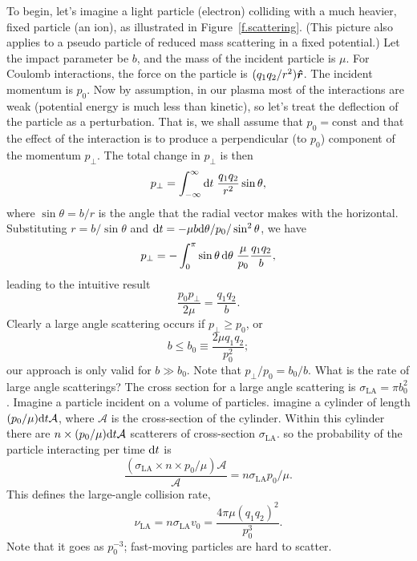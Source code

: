 To begin, let's imagine a light particle (electron) colliding with a much heavier, fixed particle (an ion), as illustrated in Figure~\ref{f.scattering}.  (This picture also applies to a pseudo particle of reduced mass scattering in a fixed potential.)  Let the impact parameter be $b$, and the mass of the incident particle is $\mu$.  For Coulomb interactions, the force on the particle is $(q_{1}q_{2}/r^{2})\boldsymbol{\hat{r}}$. The incident momentum is $p_{0}$. Now by assumption, in our plasma most of the interactions are weak (potential energy is much less than kinetic), so let's treat the deflection of the particle as a perturbation.  That is, we shall assume that $p_{0} = \textrm{const}$ and that the effect of the interaction is to produce a perpendicular (to $p_{0}$) component of the momentum $p_{\bot}$.  The total change in $p_{\bot}$ is then
\[ p_{\bot} = \int_{-\infty}^{\infty}\mathrm{d} t\; \frac{q_{1}q_{2}}{r^{2}}\sin\theta, \]
where $\sin\theta = b/r$ is the angle that the radial vector makes with the horizontal.  Substituting $r = b/\sin\theta$ and $\mathrm{d} t = -\mu b \mathrm{d} \theta/p_{0}/\sin^{2}\theta$, we have
\[ p_{\bot} = -\int_{0}^{\pi} \sin\theta\,\mathrm{d}\theta\; \frac{\mu}{p_{0}}\frac{q_{1}q_{2}}{b}, \]
leading to the intuitive result
\begin{equation}\label{e.pperp}
\frac{p_{0}p_{\bot}}{2\mu} = \frac{q_{1}q_{2}}{b}.
\end{equation}
Clearly a large angle scattering occurs if $p_{\bot}\ge p_{0}$, or
\begin{equation}\label{e.b0}
b \le b_{0} \equiv \frac{2\mu q_{1}q_{2}}{p_{0}^{2}};
\end{equation}
our approach is only valid for $b \gg b_{0}$.  Note that $p_{\bot}/p_{0} = b_{0}/b$. What is the rate of large angle  scatterings? The cross section for a large angle scattering is
$ \sigma_{\mathrm{LA}} = \pi b_{0}^{2}$.  Imagine a particle incident on a volume of particles.  imagine a cylinder of length $(p_{0}/\mu)\mathrm{d} t \mathcal{A}$, where $\mathcal{A}$ is the cross-section of the cylinder.  Within this cylinder there are $n\times (p_{0}/\mu)\mathrm{d} t \mathcal{A}$ scatterers of cross-section $\sigma_{\mathrm{LA}}$. so the probability of the particle interacting per time $\mathrm{d} t$ is
\[ \frac{(\sigma_{\mathrm{LA}}\times n\times p_{0}/\mu) \mathcal{A}}{\mathcal{A}}  = n\sigma_{\mathrm{LA}} p_{0}/\mu. \]
This defines the large-angle collision rate,
\begin{equation}\label{e.large-angle-collision-rate}
\nu_{\mathrm{LA}} = n\sigma_{\mathrm{LA}} v_{0} = \frac{4\pi \mu (q_{1}q_{2})^{2}}{p_{0}^{3}}.
\end{equation}
Note that it goes as $p_{0}^{-3}$; fast-moving particles are hard to scatter.

